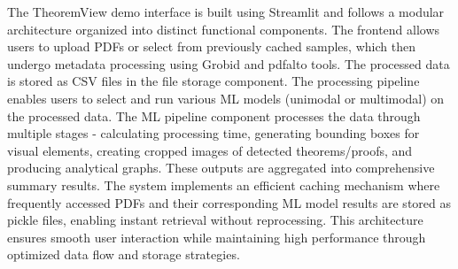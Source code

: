 \documentclass[runningheads]{llncs}
\begin{document}
The TheoremView demo interface is built using Streamlit and follows a modular
architecture organized into distinct functional components. The frontend
allows users to upload PDFs or select from previously cached samples, which then
undergo metadata processing using Grobid and pdfalto tools. The processed
data is stored as CSV files in the file storage component. The processing 
pipeline enables users to select and run various ML models (unimodal or 
multimodal) on the processed data. The ML pipeline component processes the 
data through multiple stages - calculating processing time, generating 
bounding boxes for visual elements, creating cropped images of detected 
theorems/proofs, and producing analytical graphs. These outputs are 
aggregated into comprehensive summary results. The system implements an 
efficient caching mechanism where frequently accessed PDFs and their 
corresponding ML model results are stored as pickle files, enabling instant 
retrieval without reprocessing. This architecture ensures smooth user 
interaction while maintaining high performance through optimized data flow 
and storage strategies.
\end{document}
